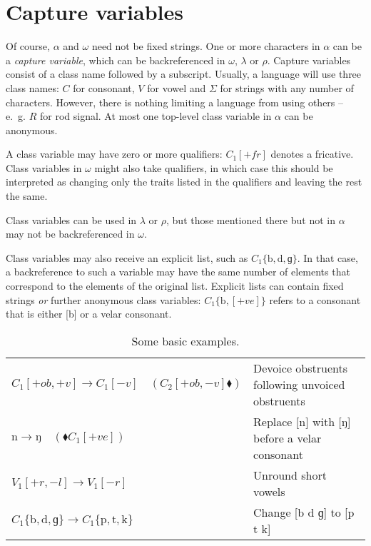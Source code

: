 \documentclass{book}
\begin{document}
\section{Capture variables}

Of course, $\alpha$ and $\omega$ need not be fixed strings. One or more characters in $\alpha$ can be a \emph{capture variable}, which can be backreferenced in $\omega$, $\lambda$ or $\rho$. Capture variables consist of a class name followed by a subscript. Usually, a language will use three class names: $C$ for consonant, $V$ for vowel and $\Sigma$ for strings with any number of characters. However, there is nothing limiting a language from using others -- e.~g. $R$ for rod signal. At most one top-level class variable in $\alpha$ can be anonymous.

A class variable may have zero or more qualifiers: $C_1[+fr]$ denotes a fricative. Class variables in $\omega$ might also take qualifiers, in which case this should be interpreted as changing only the traits listed in the qualifiers and leaving the rest the same.

Class variables can be used in $\lambda$ or $\rho$, but those mentioned there but not in $\alpha$ may not be backreferenced in $\omega$.

Class variables may also receive an explicit list, such as $C_1\{\text{b}, \text{d}, \text{ɡ}\}$. In that case, a backreference to such a variable may have the same number of elements that correspond to the elements of the original list. Explicit lists can contain fixed strings \emph{or} further anonymous class variables: $C_1\{\text{b}, [+ve]\}$ refers to a consonant that is either [b] or a velar consonant.

\begin{table}[h]
  \caption{Some basic examples.}
  \centering
  \begin{tabu} to \linewidth {|l|X|}
    \hline
    $C_1[+ob,+v] \rightarrow C_1[-v] \quad(C_2[+ob,-v] \blacklozenge)$ & Devoice obstruents following unvoiced obstruents \\
    $\text{n} \rightarrow \text{ŋ} \quad(\blacklozenge C_1[+ve])$ & Replace [n] with [ŋ] before a velar consonant \\
    $V_1[+r,-l] \rightarrow V_1[-r]$ & Unround short vowels \\
    $C_1\{\text{b}, \text{d}, \text{ɡ}\} \rightarrow C_1\{\text{p}, \text{t}, \text{k}\}$ & Change [b d ɡ] to [p t k] \\
    \hline
  \end{tabu}
\end{table}
\end{document}
